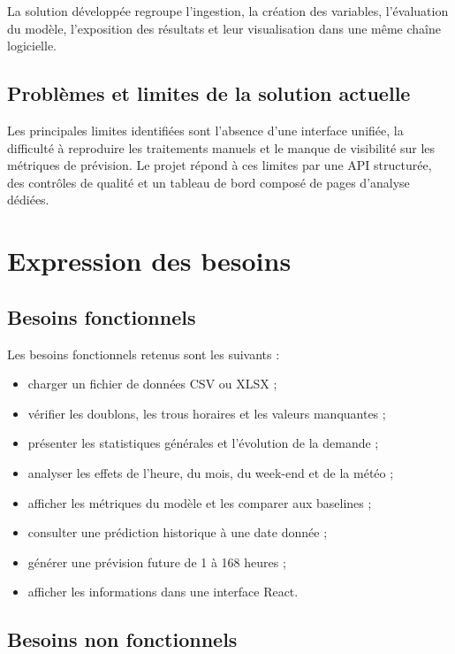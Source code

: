 \documentclass[12pt,a4paper]{report}
\begin{document}
La solution développée regroupe l'ingestion, la création des variables,
l'évaluation du modèle, l'exposition des résultats et leur visualisation dans
une même chaîne logicielle.

\subsection{Problèmes et limites de la solution actuelle}

Les principales limites identifiées sont l'absence d'une interface unifiée,
la difficulté à reproduire les traitements manuels et le manque de visibilité
sur les métriques de prévision. Le projet répond à ces limites par une API
structurée, des contrôles de qualité et un tableau de bord composé de pages
d'analyse dédiées.

\section{Expression des besoins}

\subsection{Besoins fonctionnels}

Les besoins fonctionnels retenus sont les suivants :

\begin{itemize}
	\item charger un fichier de données CSV ou XLSX ;
	\item vérifier les doublons, les trous horaires et les valeurs manquantes ;
	\item présenter les statistiques générales et l'évolution de la demande ;
	\item analyser les effets de l'heure, du mois, du week-end et de la météo ;
	\item afficher les métriques du modèle et les comparer aux baselines ;
	\item consulter une prédiction historique à une date donnée ;
	\item générer une prévision future de 1 à 168 heures ;
	\item afficher les informations dans une interface React.
\end{itemize}

\subsection{Besoins non fonctionnels}
\end{document}
